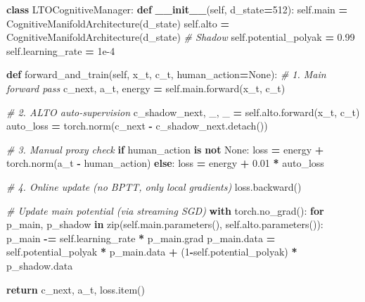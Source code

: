 \documentclass[
  11pt,
  a4paper,
]{article}
\newenvironment{Shaded}{\begin{snugshade}}{\end{snugshade}}
\newcommand{\BuiltInTok}[1]{#1}
\newcommand{\CommentTok}[1]{\textcolor[rgb]{0.56,0.35,0.01}{\textit{#1}}}
\newcommand{\ControlFlowTok}[1]{\textcolor[rgb]{0.13,0.29,0.53}{\textbf{#1}}}
\newcommand{\DecValTok}[1]{\textcolor[rgb]{0.00,0.00,0.81}{#1}}
\newcommand{\FloatTok}[1]{\textcolor[rgb]{0.00,0.00,0.81}{#1}}
\newcommand{\FunctionTok}[1]{\textcolor[rgb]{0.13,0.29,0.53}{\textbf{#1}}}
\newcommand{\KeywordTok}[1]{\textcolor[rgb]{0.13,0.29,0.53}{\textbf{#1}}}
\newcommand{\NormalTok}[1]{#1}
\newcommand{\OperatorTok}[1]{\textcolor[rgb]{0.81,0.36,0.00}{\textbf{#1}}}
\newcommand{\VariableTok}[1]{\textcolor[rgb]{0.00,0.00,0.00}{#1}}
\begin{document}
\begin{Shaded}
\begin{Highlighting}[]
\KeywordTok{class}\NormalTok{ LTOCognitiveManager:}
    \KeywordTok{def} \FunctionTok{\_\_init\_\_}\NormalTok{(}\VariableTok{self}\NormalTok{, d\_state}\OperatorTok{=}\DecValTok{512}\NormalTok{):}
        \VariableTok{self}\NormalTok{.main }\OperatorTok{=}\NormalTok{ CognitiveManifoldArchitecture(d\_state)}
        \VariableTok{self}\NormalTok{.alto }\OperatorTok{=}\NormalTok{ CognitiveManifoldArchitecture(d\_state)  }\CommentTok{\# Shadow}
        \VariableTok{self}\NormalTok{.potential\_polyak }\OperatorTok{=} \FloatTok{0.99}
        \VariableTok{self}\NormalTok{.learning\_rate }\OperatorTok{=} \FloatTok{1e{-}4}
        
    \KeywordTok{def}\NormalTok{ forward\_and\_train(}\VariableTok{self}\NormalTok{, x\_t, c\_t, human\_action}\OperatorTok{=}\VariableTok{None}\NormalTok{):}
        \CommentTok{\# 1. Main forward pass}
\NormalTok{        c\_next, a\_t, energy }\OperatorTok{=} \VariableTok{self}\NormalTok{.main.forward(x\_t, c\_t)}
        
        \CommentTok{\# 2. ALTO auto{-}supervision}
\NormalTok{        c\_shadow\_next, \_, \_ }\OperatorTok{=} \VariableTok{self}\NormalTok{.alto.forward(x\_t, c\_t)}
\NormalTok{        auto\_loss }\OperatorTok{=}\NormalTok{ torch.norm(c\_next }\OperatorTok{{-}}\NormalTok{ c\_shadow\_next.detach())}
        
        \CommentTok{\# 3. Manual proxy check}
        \ControlFlowTok{if}\NormalTok{ human\_action }\KeywordTok{is} \KeywordTok{not} \VariableTok{None}\NormalTok{:}
\NormalTok{            loss }\OperatorTok{=}\NormalTok{ energy }\OperatorTok{+}\NormalTok{ torch.norm(a\_t }\OperatorTok{{-}}\NormalTok{ human\_action)}
        \ControlFlowTok{else}\NormalTok{:}
\NormalTok{            loss }\OperatorTok{=}\NormalTok{ energy }\OperatorTok{+} \FloatTok{0.01} \OperatorTok{*}\NormalTok{ auto\_loss}
        
        \CommentTok{\# 4. Online update (no BPTT, only local gradients)}
\NormalTok{        loss.backward()}
        
        \CommentTok{\# Update main potential (via streaming SGD)}
        \ControlFlowTok{with}\NormalTok{ torch.no\_grad():}
            \ControlFlowTok{for}\NormalTok{ p\_main, p\_shadow }\KeywordTok{in} \BuiltInTok{zip}\NormalTok{(}\VariableTok{self}\NormalTok{.main.parameters(), }\VariableTok{self}\NormalTok{.alto.parameters()):}
\NormalTok{                p\_main }\OperatorTok{{-}=} \VariableTok{self}\NormalTok{.learning\_rate }\OperatorTok{*}\NormalTok{ p\_main.grad}
\NormalTok{                p\_main.data }\OperatorTok{=} \VariableTok{self}\NormalTok{.potential\_polyak }\OperatorTok{*}\NormalTok{ p\_main.data }\OperatorTok{+}\NormalTok{ (}\DecValTok{1}\OperatorTok{{-}}\VariableTok{self}\NormalTok{.potential\_polyak) }\OperatorTok{*}\NormalTok{ p\_shadow.data}
        
        \ControlFlowTok{return}\NormalTok{ c\_next, a\_t, loss.item()}
\end{Highlighting}
\end{Shaded}
\end{document}
